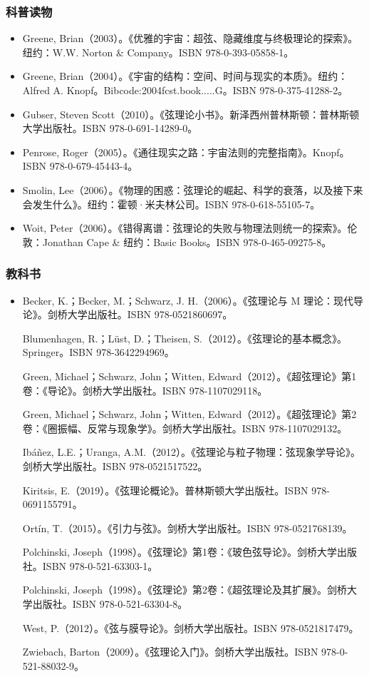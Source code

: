 \subsubsection{科普读物} 
\begin{itemize}
\item Greene, Brian（2003）。《优雅的宇宙：超弦、隐藏维度与终极理论的探索》。纽约：W.W. Norton & Company。ISBN 978-0-393-05858-1。  
\item Greene, Brian（2004）。《宇宙的结构：空间、时间与现实的本质》。纽约：Alfred A. Knopf。Bibcode:2004fcst.book.....G。ISBN 978-0-375-41288-2。  
\item Gubser, Steven Scott（2010）。《弦理论小书》。新泽西州普林斯顿：普林斯顿大学出版社。ISBN 978-0-691-14289-0。  
\item Penrose, Roger（2005）。《通往现实之路：宇宙法则的完整指南》。Knopf。ISBN 978-0-679-45443-4。  
\item Smolin, Lee（2006）。《物理的困惑：弦理论的崛起、科学的衰落，以及接下来会发生什么》。纽约：霍顿·米夫林公司。ISBN 978-0-618-55105-7。  
\item Woit, Peter（2006）。《错得离谱：弦理论的失败与物理法则统一的探索》。伦敦：Jonathan Cape & 纽约：Basic Books。ISBN 978-0-465-09275-8。
\end{itemize}
\subsubsection{教科书} 
\begin{itemize}
\item Becker, K.；Becker, M.；Schwarz, J. H.（2006）。《弦理论与 M 理论：现代导论》。剑桥大学出版社。ISBN 978-0521860697。  

Blumenhagen, R.；Lüst, D.；Theisen, S.（2012）。《弦理论的基本概念》。Springer。ISBN 978-3642294969。  

Green, Michael；Schwarz, John；Witten, Edward（2012）。《超弦理论》第1卷：《导论》。剑桥大学出版社。ISBN 978-1107029118。  

Green, Michael；Schwarz, John；Witten, Edward（2012）。《超弦理论》第2卷：《圈振幅、反常与现象学》。剑桥大学出版社。ISBN 978-1107029132。  

Ibáñez, L.E.；Uranga, A.M.（2012）。《弦理论与粒子物理：弦现象学导论》。剑桥大学出版社。ISBN 978-0521517522。  

Kiritsis, E.（2019）。《弦理论概论》。普林斯顿大学出版社。ISBN 978-0691155791。  

Ortín, T.（2015）。《引力与弦》。剑桥大学出版社。ISBN 978-0521768139。  

Polchinski, Joseph（1998）。《弦理论》第1卷：《玻色弦导论》。剑桥大学出版社。ISBN 978-0-521-63303-1。  

Polchinski, Joseph（1998）。《弦理论》第2卷：《超弦理论及其扩展》。剑桥大学出版社。ISBN 978-0-521-63304-8。  

West, P.（2012）。《弦与膜导论》。剑桥大学出版社。ISBN 978-0521817479。  

Zwiebach, Barton（2009）。《弦理论入门》。剑桥大学出版社。ISBN 978-0-521-88032-9。
\end{itemize}